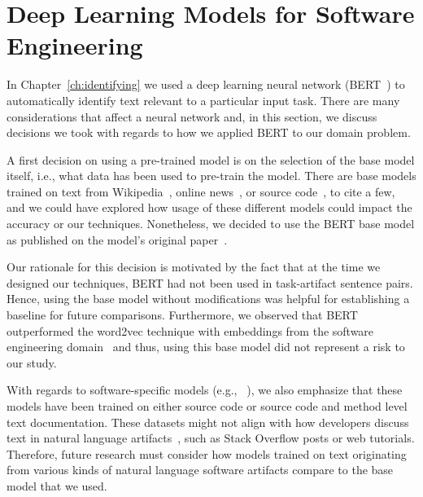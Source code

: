 


\section{Deep Learning Models for Software Engineering}
\label{cp7:deep-learning}




In Chapter~\ref{ch:identifying} we used a deep learning neural network (BERT~\cite{Devlin2018Bert})
to automatically identify text relevant to a particular input task. There are many considerations 
that affect a neural network and, in this section, we discuss decisions we took 
with regards to how we applied BERT to our domain problem. 



A first decision on using a pre-trained model is on the selection of the base model itself, i.e., what data has been used to pre-train the model. 
There are base models trained on text from Wikipedia~\cite{Devlin2018Bert},  online news~\cite{peters2018elmo}, 
or source code~\cite{feng2020-codebert}, to  cite a few,
and we could have explored how usage of these different models could impact the accuracy or our 
techniques. Nonetheless, we decided to use 
the BERT base model as published on the model's original paper~\cite{Devlin2018Bert}.


Our rationale for this decision is motivated by the fact that at the time we designed our techniques, 
BERT had not been used in task-artifact sentence pairs. Hence, using the base model without modifications
was helpful for establishing a baseline for future comparisons.
Furthermore,  we observed that BERT outperformed 
the word2vec technique with embeddings from the software engineering domain~\cite{Efstathiou2018}
and thus, using this base model did not represent a risk to our study.


With regards to software-specific models (e.g., ~\cite{feng2020-codebert, li2019neural}), we also emphasize 
that these models have been trained on either source code or source code and method level text documentation. 
These datasets might not align with how developers discuss text in natural language artifacts~\cite{arya2020}, such 
as Stack Overflow posts or web tutorials. Therefore, future research must consider how 
 models trained on text originating from various kinds of 
natural language software artifacts compare to the base model that we used.



